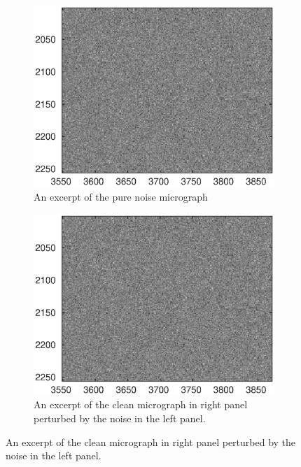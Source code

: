 \documentclass[9pt,twocolumn,twoside,lineno]{pnas-new}
\begin{document}
\begin{figure}[t!]
	\centering
	\begin{subfigure}[t]{0.3\textwidth}
		\centering
		\includegraphics[scale=0.4]{pure_noise_micrograph_cutout.eps}
		\caption{An excerpt of the pure noise micrograph}
	\end{subfigure} \hspace{2pt}
	\begin{subfigure}[t]{0.3\textwidth}
		\centering
		\includegraphics[scale=0.4]{noisy_micrograph_cutout.eps}
		\caption{An excerpt of the clean micrograph in right panel perturbed by the noise in the left panel.}
	\end{subfigure} \hspace{2pt}

\end{figure}
\end{document}
